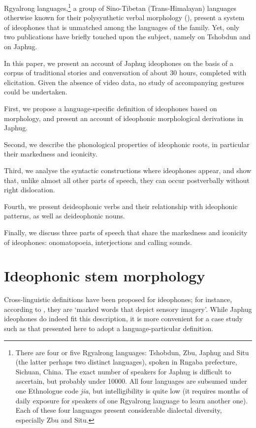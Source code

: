 \documentclass[oldfontcommands,oneside,a4paper,11pt]{article}
\begin{document}
 Rgyalrong languages,\footnote{There are  four or five Rgyalrong languages: Tshobdun, Zbu, Japhug and Situ (the latter perhaps two distinct languages),  spoken in Rngaba prefecture, Sichuan, China. The exact number of speakers for Japhug is difficult to ascertain, but probably under 10000. All four languages are subsumed under one Ethnologue code \textit{jia}, but intelligibility is quite low (it requires months of daily exposure for speakers of one Rgyalrong language to learn another one). Each of these four languages  present considerable dialectal diversity, especially Zbu and Situ.  } a group of Sino-Tibetan (Trans-Himalayan) languages otherwise known for their polysynthetic verbal morphology (\citealt{jacques12incorp}), present a system of ideophones that is   unmatched   among the languages of the family. Yet, only two publications have briefly touched upon the subject, namely \citet{jackson04zhuangmaoci} on Tshobdun and \citet[305-17]{jacques08zh} on Japhug. 
 
 
 In this paper, we present an account of Japhug ideophones on the basis of a corpus of traditional stories and conversation of about 30 hours, completed with elicitation. Given the absence of video data, no study of accompanying gestures could be undertaken.
 
  First, we propose a language-specific definition of ideophones  based on morphology, and present an account of ideophonic morphological derivations in Japhug.
  
   Second,  we describe the phonological properties of ideophonic roots, in particular their markedness and iconicity.
 
  Third, we analyse the syntactic constructions where ideophones appear, and show that, unlike almost all other parts of speech, they can occur postverbally without right dislocation.
  
  Fourth, we present deideophonic verbs and their relationship with ideophonic patterns, as well as deideophonic nouns.  
  
  Finally, we discuss   three parts of speech that share  the  markedness and iconicity of ideophones: onomatopoeia, interjections and calling sounds.



\section{Ideophonic stem morphology} \label{sec:ideo:morpho}


Cross-linguistic definitions have been proposed for ideophones; for instance, according to \citet[2]{dingemanse14}, they are `marked words that depict sensory imagery'.  While  Japhug ideophones do indeed fit this description, it is more convenient for a case study such as that presented here to adopt a language-particular definition. 
\end{document}
